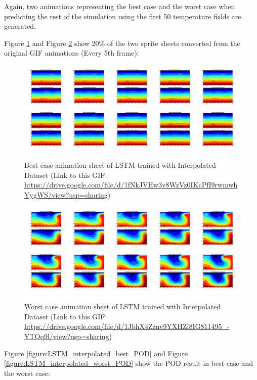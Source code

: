 Again, two animations representing the best case and the worst case when predicting the rest of the simulation using the first 50 temperature fields are generated.

Figure \ref{figure:LSTM_interpolated_best_gif} and Figure \ref{figure:LSTM_interpolated_worst_gif} show 20\% of the two sprite sheets converted from the original GIF animations (Every 5th frame):

\begin{figure}[H]
    \centering
    \caption{Best case animation sheet of LSTM trained with Interpolated Dataset (Link to this GIF: \url{https://drive.google.com/file/d/1fNkJVHw3v8WzVz0IKcPfI9rwmwhYygWS/view?usp=sharing})}
    \includegraphics[scale=0.10]{figures/mantle_convection_images/larger_dataset_interpolated/LSTM_Best_GIF_sheet.png}
     \label{figure:LSTM_interpolated_best_gif}
\end{figure}

\begin{figure}[H]
    \centering
    \caption{Worst case animation sheet of LSTM trained with Interpolated Dataset (Link to this GIF: 
    \url{https://drive.google.com/file/d/1JbhX4Zznv9YXHZi8IG811495_-YTOq9l/view?usp=sharing})}
    \includegraphics[scale=0.10]{figures/mantle_convection_images/larger_dataset_interpolated/LSTM_Worst_GIF_sheet.png}
    \label{figure:LSTM_interpolated_worst_gif}
\end{figure}

Figure \ref{figure:LSTM_interpolated_best_POD} and Figure \ref{figure:LSTM_interpolated_worst_POD} show the POD result in best case and the worst case:

